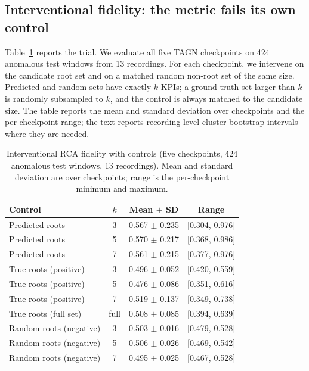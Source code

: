 \documentclass[conference]{IEEEtran}
\begin{document}
\subsection{Interventional fidelity: the metric fails its own control}

Table~\ref{tab:fidelity} reports the trial. We evaluate all five TAGN checkpoints on 424 anomalous test windows from 13 recordings. For each checkpoint, we intervene on the candidate root set and on a matched random non-root set of the same size. Predicted and random sets have exactly $k$ KPIs; a ground-truth set larger than $k$ is randomly subsampled to $k$, and the control is always matched to the candidate size. The table reports the mean and standard deviation over checkpoints and the per-checkpoint range; the text reports recording-level cluster-bootstrap intervals where they are needed.

\begin{table}[t]
\centering
\caption{Interventional RCA fidelity with controls (five checkpoints, 424 anomalous test windows, 13 recordings). Mean and standard deviation are over checkpoints; range is the per-checkpoint minimum and maximum.}
\label{tab:fidelity}
\footnotesize
\setlength{\tabcolsep}{3pt}
\begin{tabular}{lccc}
\toprule
Control & $k$ & Mean $\pm$ SD & Range \\
\midrule
Predicted roots & 3 & 0.567 $\pm$ 0.235 & [0.304, 0.976] \\
Predicted roots & 5 & 0.570 $\pm$ 0.217 & [0.368, 0.986] \\
Predicted roots & 7 & 0.561 $\pm$ 0.215 & [0.377, 0.976] \\
True roots (positive) & 3 & 0.496 $\pm$ 0.052 & [0.420, 0.559] \\
True roots (positive) & 5 & 0.476 $\pm$ 0.086 & [0.351, 0.616] \\
True roots (positive) & 7 & 0.519 $\pm$ 0.137 & [0.349, 0.738] \\
True roots (full set) & full & 0.508 $\pm$ 0.085 & [0.394, 0.639] \\
Random roots (negative) & 3 & 0.503 $\pm$ 0.016 & [0.479, 0.528] \\
Random roots (negative) & 5 & 0.506 $\pm$ 0.026 & [0.469, 0.542] \\
Random roots (negative) & 7 & 0.495 $\pm$ 0.025 & [0.467, 0.528] \\
\bottomrule
\end{tabular}
\end{table}
\end{document}

